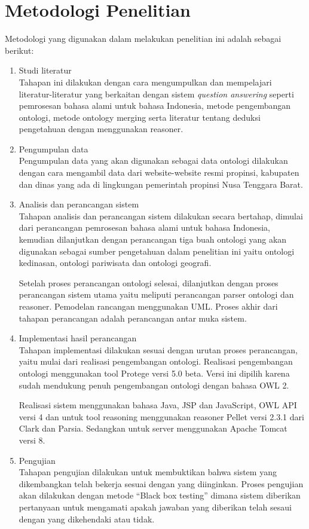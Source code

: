 \section{Metodologi Penelitian}
Metodologi yang digunakan dalam melakukan penelitian ini adalah sebagai berikut:
\begin{enumerate}
	\item Studi literatur\\
	Tahapan ini dilakukan dengan cara mengumpulkan dan mempelajari literatur-literatur yang berkaitan dengan sistem \emph{question answering} seperti pemrosesan bahasa alami untuk bahasa Indonesia, metode pengembangan ontologi, metode ontology merging serta literatur tentang deduksi pengetahuan dengan menggunakan reasoner.
	\item Pengumpulan data\\
	Pengumpulan data yang akan digunakan sebagai data ontologi dilakukan dengan cara mengambil data dari website-website resmi propinsi, kabupaten dan dinas yang ada di lingkungan pemerintah propinsi Nusa Tenggara Barat.
	\item Analisis dan perancangan sistem\\
	Tahapan analisis dan perancangan sistem dilakukan secara bertahap, dimulai dari perancangan pemrosesan bahasa alami untuk bahasa Indonesia, kemudian dilanjutkan dengan perancangan tiga buah ontologi yang akan digunakan sebagai sumber pengetahuan dalam penelitian ini yaitu ontologi kedinasan, ontologi pariwisata dan ontologi geografi.

	Setelah proses perancangan ontologi selesai, dilanjutkan dengan proses perancangan sistem utama yaitu meliputi perancangan parser ontologi dan reasoner. Pemodelan rancangan menggunakan UML. Proses akhir dari tahapan perancangan adalah perancangan antar muka sistem.
	\item Implementasi hasil perancangan\\
	Tahapan implementasi dilakukan sesuai dengan urutan proses perancangan, yaitu mulai dari realisasi pengembangan ontologi. Realisasi pengembangan ontologi menggunakan tool Protege versi 5.0 beta. Versi ini dipilih karena sudah mendukung penuh pengembangan ontologi dengan bahasa OWL 2.

	Realisasi sistem menggunakan bahasa Java, JSP dan JavaScript, OWL API versi 4 dan untuk tool reasoning menggunakan reasoner Pellet versi 2.3.1 dari Clark dan Parsia. Sedangkan untuk server menggunakan Apache Tomcat versi 8.
	\item Pengujian\\
	Tahapan pengujian dilakukan untuk membuktikan bahwa sistem yang dikembangkan telah bekerja sesuai dengan yang diinginkan. Proses pengujian akan dilakukan dengan metode ``Black box testing'' dimana sistem diberikan pertanyaan untuk mengamati apakah jawaban yang diberikan telah sesaui dengan yang dikehendaki atau tidak.


\end{enumerate}
